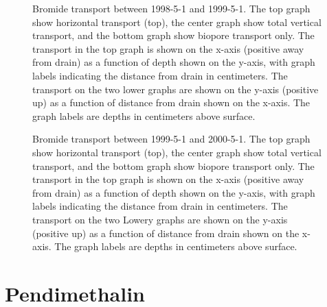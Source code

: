 \begin{figure}[htbp]
  \centering

  
  \caption{Bromide transport between 1998-5-1 and 1999-5-1.  The top
    graph show horizontal transport (top), the center graph show total
    vertical transport, and the bottom graph show biopore transport
    only.  The transport in the top graph is shown on the x-axis
    (positive away from drain) as a function of depth shown on the
    y-axis, with graph labels indicating the distance from drain in
    centimeters.  The transport on the two lower graphs are shown on
    the y-axis (positive up) as a function of distance from drain
    shown on the x-axis. The graph labels are depths in centimeters above
    surface.}
  \label{fig:Rorrende-Bromide-1998}
\end{figure}

\begin{figure}[htbp]
  \centering

  
  \caption{Bromide transport between 1999-5-1 and 2000-5-1.  The top
    graph show horizontal transport (top), the center graph show total
    vertical transport, and the bottom graph show biopore transport
    only.  The transport in the top graph is shown on the x-axis
    (positive away from drain) as a function of depth shown on the
    y-axis, with graph labels indicating the distance from drain in
    centimeters.  The transport on the two Lowery graphs are shown on
    the y-axis (positive up) as a function of distance from drain
    shown on the x-axis. The graph labels are depths in centimeters above
    surface.}
  \label{fig:Rorrende-Bromide-1999}
\end{figure}

\FloatBarrier
\section{Pendimethalin}

